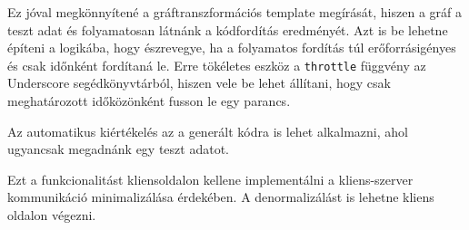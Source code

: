 Ez jóval megkönnyítené a gráftranszformációs template megírását, hiszen a gráf a teszt adat és folyamatosan látnánk a kódfordítás eredményét. Azt is be lehetne építeni a logikába, hogy észrevegye, ha a folyamatos fordítás túl erőforrásigényes és csak időnként fordítaná le. Erre tökéletes eszköz a \lstinline{throttle} függvény az Underscore segédkönyvtárból, hiszen vele be lehet állítani, hogy csak meghatározott időközönként fusson le egy parancs.

Az automatikus kiértékelés az a generált kódra is lehet alkalmazni, ahol ugyancsak megadnánk egy teszt adatot. 

Ezt a funkcionalitást kliensoldalon kellene implementálni a kliens-szerver kommunikáció minimalizálása érdekében. A denormalizálást is lehetne kliens oldalon végezni.